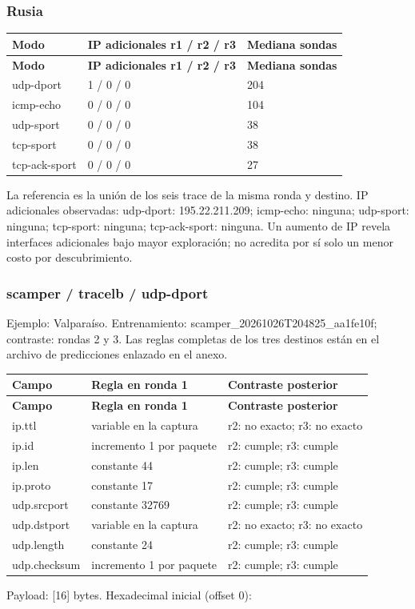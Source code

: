 \subsubsection{Rusia}
\begingroup
\fontsize{9}{11}\selectfont
\addtocounter{table}{-1}
\begin{longtable}{p{3.2cm}p{8cm}p{3cm}}
\toprule
\textbf{Modo} & \textbf{IP adicionales r1 / r2 / r3} & \textbf{Mediana sondas} \\ \midrule
\endfirsthead
\toprule
\textbf{Modo} & \textbf{IP adicionales r1 / r2 / r3} & \textbf{Mediana sondas} \\ \midrule
\endhead
udp-dport & 1 / 0 / 0 & 204 \\
icmp-echo & 0 / 0 / 0 & 104 \\
udp-sport & 0 / 0 / 0 & 38 \\
tcp-sport & 0 / 0 / 0 & 38 \\
tcp-ack-sport & 0 / 0 / 0 & 27 \\
\bottomrule
\end{longtable}
\endgroup
La referencia es la unión de los seis trace de la misma ronda y destino. IP adicionales observadas: udp-dport: 195.22.211.209; icmp-echo: ninguna; udp-sport: ninguna; tcp-sport: ninguna; tcp-ack-sport: ninguna. Un aumento de IP revela interfaces adicionales bajo mayor exploración; no acredita por sí solo un menor costo por descubrimiento.

\subsubsection{scamper / tracelb / udp-dport}
Ejemplo: Valparaíso. Entrenamiento: scamper\_\allowbreak{}20261026T204825\_\allowbreak{}aa1fe10f; contraste: rondas 2 y 3. Las reglas completas de los tres destinos están en el archivo de predicciones enlazado en el anexo.

\begingroup
\fontsize{9}{11}\selectfont
\addtocounter{table}{-1}
\begin{longtable}{p{3.1cm}p{5.8cm}p{5.1cm}}
\toprule
\textbf{Campo} & \textbf{Regla en ronda 1} & \textbf{Contraste posterior} \\ \midrule
\endfirsthead
\toprule
\textbf{Campo} & \textbf{Regla en ronda 1} & \textbf{Contraste posterior} \\ \midrule
\endhead
ip.ttl & variable en la captura & r2: no exacto; r3: no exacto \\
ip.id & incremento 1 por paquete & r2: cumple; r3: cumple \\
ip.len & constante 44 & r2: cumple; r3: cumple \\
ip.proto & constante 17 & r2: cumple; r3: cumple \\
udp.srcport & constante 32769 & r2: cumple; r3: cumple \\
udp.dstport & variable en la captura & r2: no exacto; r3: no exacto \\
udp.length & constante 24 & r2: cumple; r3: cumple \\
udp.checksum & incremento 1 por paquete & r2: cumple; r3: cumple \\
\bottomrule
\end{longtable}
\endgroup
Payload: [16] bytes. Hexadecimal inicial (offset 0):

